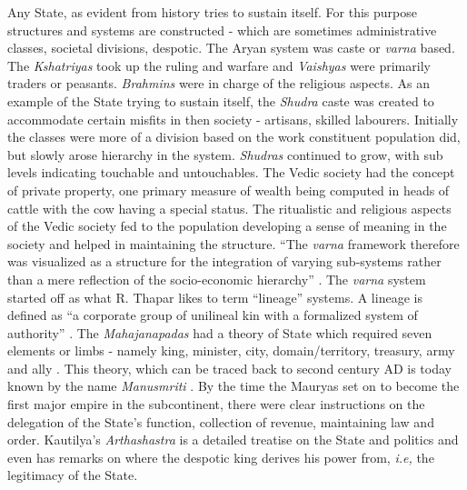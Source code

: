 \documentclass[a4paper]{article}
\begin{document}
Any State, as evident from history tries to sustain itself. For this
purpose structures and systems are constructed - which are sometimes
administrative classes, societal divisions, despotic. The Aryan system
was caste or \textit{varna} based. The \textit{Kshatriyas} took up the
ruling and warfare and \textit{Vaishyas} were primarily traders or
peasants. \textit{Brahmins} were in charge of the religious aspects. As
an example of the State trying to sustain itself, the \textit{Shudra}
caste was created to accommodate certain misfits\cite[p.
53]{thapar1984lineage} in then society - artisans, skilled labourers.
Initially the classes were more of a division based on the work
constituent population did, but slowly arose hierarchy in the system.
\textit{Shudras} continued to grow, with sub levels indicating touchable
and untouchables. The Vedic society had the concept of private property,
one primary measure of wealth being computed in heads of cattle with the
cow having a special status\cite[p. 25]{thapar1984lineage}. The
ritualistic and religious aspects of the Vedic society fed to the
population developing a sense of meaning in the society and helped in
maintaining the structure. ``The \textit{varna} framework therefore was
visualized as a structure for the integration of varying sub-systems
rather than a mere reflection of the socio-economic hierarchy'' \cite[p.
54]{thapar1984lineage}. The \textit{varna} system started off as what R.
Thapar likes to term ``lineage'' systems. A lineage is defined as ``a
corporate group of unilineal kin with a formalized system of authority''
\cite[p. 10]{thapar1984lineage}. The \textit{Mahajanapadas} had a theory
of State which required seven elements or limbs - namely king, minister,
city, domain/territory, treasury, army and ally \cite[p.
37]{kimura2006state}. This theory, which can be traced back to second
century AD is today known by the name \textit{Manusmriti} \cite[p.
37]{kimura2006state}. By the time the Mauryas set on to become the first
major empire in the subcontinent, there were clear instructions on the
delegation of the State's function, collection of revenue, maintaining
law and order. Kautilya's \textit{Arthashastra} is a detailed treatise
on the State and politics and even has remarks on where the despotic
king derives his power from, \textit{i.e,} the legitimacy of the State.
\end{document}
